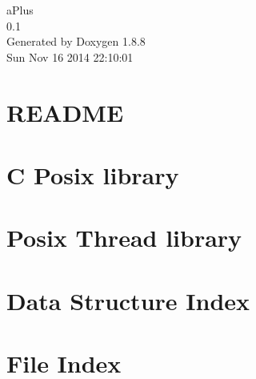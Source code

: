 \documentclass[twoside]{book}
\newcommand{\+}{\discretionary{\mbox{\scriptsize$\hookleftarrow$}}{}{}}
\newcommand{\clearemptydoublepage}{%
  \newpage{\pagestyle{empty}\cleardoublepage}%
}
\begin{document}
\hypersetup{pageanchor=false,
             bookmarks=true,
             bookmarksnumbered=true,
             pdfencoding=unicode
            }
\begin{titlepage}
\vspace*{7cm}
\begin{center}%
{\Large a\+Plus \\[1ex]\large 0.\+1 }\\
\vspace*{1cm}
{\large Generated by Doxygen 1.8.8}\\
\vspace*{0.5cm}
{\small Sun Nov 16 2014 22:10:01}\\
\end{center}
\end{titlepage}
\clearemptydoublepage
\tableofcontents
\clearemptydoublepage
{}
\hypersetup{pageanchor=true}

\chapter{R\+E\+A\+D\+M\+E}
\label{md_README}
\hypertarget{md_README}{}

\chapter{C Posix library}
\label{md_usr_src_libposix_README}
\hypertarget{md_usr_src_libposix_README}{}

\chapter{Posix Thread library}
\label{md_usr_src_libpthread_README}
\hypertarget{md_usr_src_libpthread_README}{}

\chapter{Data Structure Index}

\chapter{File Index}

\end{document}
